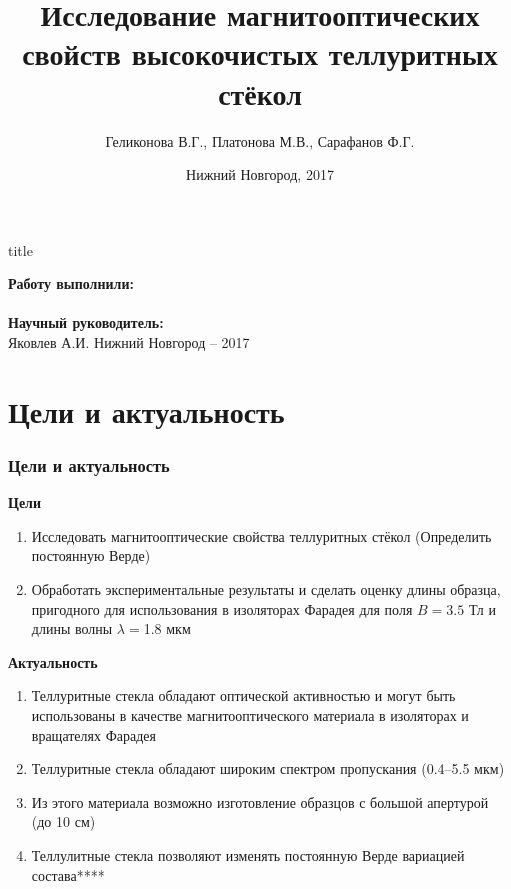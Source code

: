 \documentclass[10pt,pdf,hyperref={unicode}, dvipsnames]{beamer}
\title[Магнитооптическая активность теллуритных стёкол]{Исследование магнитооптических свойств высокочистых теллуритных стёкол}
\author{%
	Геликонова В.Г., %
	Платонова М.В., %
	Сарафанов Ф.Г. %
}
\institute{Радиофизический факультет ННГУ, 420 группа}
\date{Нижний Новгород, 2017}
\begin{document}
  

\begin{frame}[plain]
	\centering
	\vspace{2cm}
	\begin{beamercolorbox}[sep=8pt,center]{title}
		\bf{}\inserttitle
	\end{beamercolorbox}
	\vspace{0.5cm}
	\normalsize \textbf{Работу выполнили:}\\
	\large\insertauthor\\ 
	\vspace{0.5cm}
	\normalsize{\textbf{Научный руководитель:}\\}
	\large{Яковлев А.И.}
	\vfill
	\small{Нижний Новгород -- 2017}
\end{frame}
\section{Цели и актуальность}
\begin{frame}[t]
	\frametitle{Цели и актуальность}
	\textbf{Цели}\\
	\begin{enumerate}
		\item Исследовать магнитооптические свойства теллуритных стёкол (Определить постоянную Верде)
		\item Обработать экспериментальные  результаты и сделать оценку длины образца, пригодного для использования в изоляторах Фарадея для поля $B=3.5$ Тл и длины волны $\lambda=$1.8 мкм
	\end{enumerate}
	\textbf{Актуальность}\\
	\begin{enumerate}
		\item Теллуритные стекла обладают оптической активностью и могут быть использованы в качестве магнитооптического материала в изоляторах и вращателях Фарадея
		\item Теллуритные стекла обладают широким спектром пропускания (0.4--5.5  мкм) %
		\item Из этого материала возможно изготовление образцов с большой апертурой (до 10 см)
		\item Теллулитные стекла позволяют изменять постоянную Верде вариацией состава****
	\end{enumerate}
\end{frame}
\end{document}
